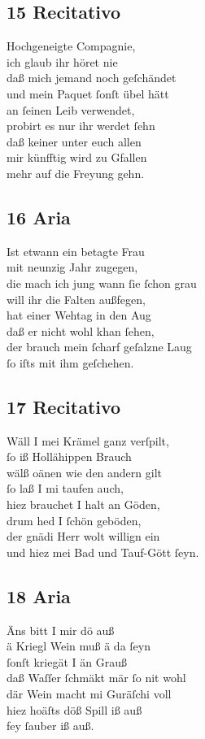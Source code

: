 \documentclass{ees}
\newenvironment{lyrics}[1]{%
  \subsection{#1}\nopagebreak%
  \begin{lyricslist}%
  \let\voice\item%
}{%
  \end{lyricslist}%
}
\begin{document}
\newpage
\begin{lyrics}{15 Recitativo}
  \voice[Arzt]
  Hochgeneigte Compagnie,\\
  ich glaub ihr höret nie\\
  daß mich jemand noch geſchändet\\
  und mein Paquet ſonſt übel hätt\\
  an ſeinen Leib verwendet,\\
  probirt es nur ihr werdet ſehn\\
  daß keiner unter euch allen\\
  mir künfftig wird zu Gfallen\\
  mehr auf die Freyung gehn.
\end{lyrics}

\begin{lyrics}{16 Aria}
  \voice[Arzt]
  Ist etwann ein betagte Frau\\
  mit neunzig Jahr zugegen,\\
  die mach ich jung wann ſie ſchon grau\\
  will ihr die Falten außfegen,\\
  hat einer Wehtag in den Aug\\
  daß er nicht wohl khan ſehen,\\
  der brauch mein ſcharf geſalzne Laug\\
  ſo iſts mit ihm geſchehen.
\end{lyrics}

\begin{lyrics}{17 Recitativo}
  \voice[H.-Krämer]
  Wäll I mei Krämel ganz verſpilt,\\
  ſo iß Hollähippen Brauch\\
  wälß oänen wie den andern gilt\\
  ſo laß I mi taufen auch,\\
  hiez brauchet I halt an Göden,\\
  drum hed I ſchön geböden,\\
  der gnädi Herr wolt willign ein\\
  und hiez mei Bad und Tauf-Gött ſeyn.
\end{lyrics}

\begin{lyrics}{18 Aria}
  \voice[H.-Krämer]
  Äns bitt I mir dö auß\\
  ä Kriegl Wein muß ä da ſeyn\\
  ſonſt kriegät I än Grauß\\
  daß Waſſer ſchmäkt mär ſo nit wohl\\
  där Wein macht mi Guräſchi voll\\
  hiez hoäſts döß Spill iß auß\\
  fey ſauber iß auß.
\end{lyrics}
\end{document}
